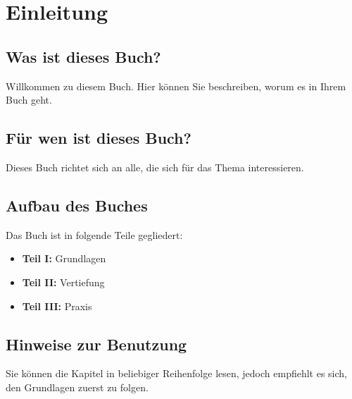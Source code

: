 
\chapter{Einleitung}

\section{Was ist dieses Buch?}

Willkommen zu diesem Buch. Hier können Sie beschreiben, worum es in Ihrem Buch geht.

\blindtext

\section{Für wen ist dieses Buch?}

Dieses Buch richtet sich an alle, die sich für das Thema interessieren.

\blindtext

\section{Aufbau des Buches}

Das Buch ist in folgende Teile gegliedert:

\begin{itemize}
	\item \textbf{Teil I:} Grundlagen
	\item \textbf{Teil II:} Vertiefung
	\item \textbf{Teil III:} Praxis
\end{itemize}

\blindtext

\section{Hinweise zur Benutzung}

Sie können die Kapitel in beliebiger Reihenfolge lesen, jedoch empfiehlt es sich, den Grundlagen zuerst zu folgen.
